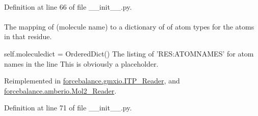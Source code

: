 \hypertarget{classforcebalance_1_1BaseReader_a80c8e3bea212600742968aa8669e557b}{
\paragraph[{ln}]{}}\label{classforcebalance_1_1BaseReader_a80c8e3bea212600742968aa8669e557b}


\-Definition at line 66 of file \-\_\-\-\_\-init\-\_\-\-\_\-.\-py.

\hypertarget{classforcebalance_1_1BaseReader_ab444c213e15929253dd73395ac5f19fc}{
\paragraph[{molatom}]{}}\label{classforcebalance_1_1BaseReader_ab444c213e15929253dd73395ac5f19fc}


\-The mapping of (molecule name) to a dictionary of of atom types for the atoms in that residue. 

self.\-moleculedict = \-Ordered\-Dict() \-The listing of '\-R\-E\-S\-:\-A\-T\-O\-M\-N\-A\-M\-E\-S' for atom names in the line \-This is obviously a placeholder. 

\-Reimplemented in \hyperlink{classforcebalance_1_1gmxio_1_1ITP__Reader_a5ed800499e9442adaea0cee243960f94}{forcebalance.\-gmxio.\-I\-T\-P\-\_\-\-Reader}, and \hyperlink{classforcebalance_1_1amberio_1_1Mol2__Reader_acdeaabdae39b208fb9430ee4cd6de113}{forcebalance.\-amberio.\-Mol2\-\_\-\-Reader}.



\-Definition at line 71 of file \-\_\-\-\_\-init\-\_\-\-\_\-.\-py.

\hypertarget{classforcebalance_1_1BaseReader_a4369b5fb663a83b11602daa71db6862e}{
\paragraph[{\-Molecules}]{}}\label{classforcebalance_1_1BaseReader_a4369b5fb663a83b11602daa71db6862e}


